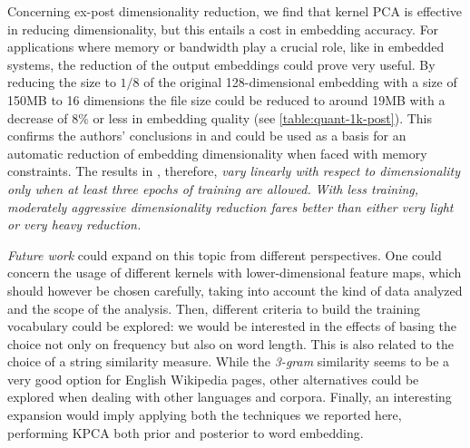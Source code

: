 Concerning ex-post dimensionality reduction, we find that kernel PCA is effective in reducing dimensionality, but this entails a cost in embedding accuracy.
For applications where memory or bandwidth play a crucial role, like in embedded systems, the reduction of the output embeddings could prove very useful.
By reducing the size to $1/8$ of the original 128-dimensional embedding with a size of 150MB to 16 dimensions the file size could be reduced to around 19MB with a decrease of $8\%$ or less in embedding quality (see \cref{table:quant-1k-post}).
This confirms the authors' conclusions in \cite{raunak_simple_2017} and could be used as a basis for an automatic reduction of embedding dimensionality when faced with memory constraints.
The results in \cite{raunak_simple_2017}, therefore, \emph{vary linearly with respect to dimensionality only when at least three epochs of training are allowed.}
\emph{With less training, moderately aggressive dimensionality reduction fares better than either very light or very heavy reduction.}


\textit{Future work} could expand on this topic from different perspectives. One could concern the usage of different kernels with lower-dimensional feature maps, which should however be chosen carefully, taking into account the kind of data analyzed and the scope of the analysis. Then, different criteria to build the training vocabulary could be explored: we would be interested in the effects of basing the choice not only on frequency but also on word length. This is also related to the choice of a string similarity measure. While the \textit{3-gram} similarity seems to be a very good option for English Wikipedia pages, other alternatives could be explored when dealing with other languages and corpora. Finally, an interesting expansion would imply applying both the techniques we reported here, performing KPCA both prior and posterior to word embedding.
